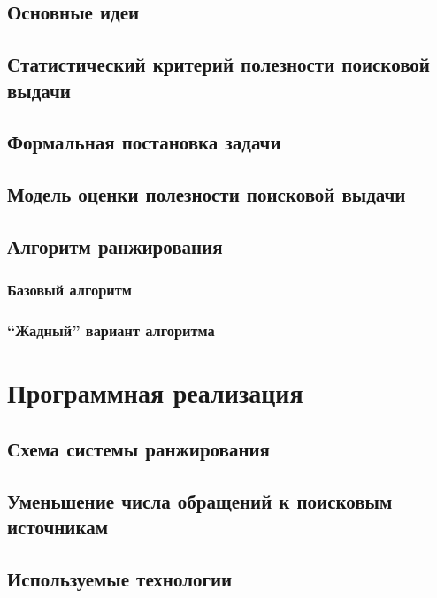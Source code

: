 \documentclass[12pt,a4paper]{report}
\begin{document}
\section{Основные идеи}
\section{Статистический критерий полезности поисковой выдачи}
\section{Формальная постановка задачи}
\section{Модель оценки полезности поисковой выдачи}
\section{Алгоритм ранжирования}
\subsection{Базовый алгоритм}
\subsection{``Жадный'' вариант алгоритма}


\chapter{Программная реализация}

\section{Схема системы ранжирования}
\section{Уменьшение числа обращений к поисковым источникам}
\section{Используемые технологии}
\end{document}
